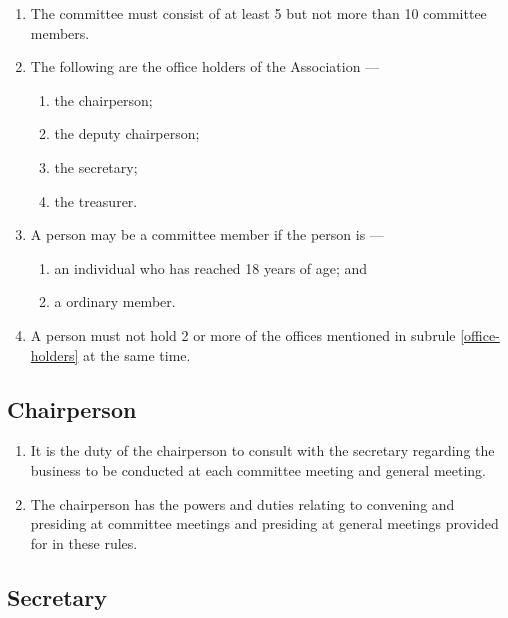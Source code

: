\documentclass[../constitution.tex]{subfiles}
\begin{document}
\begin{enumerate}

\item \label{number-of-committee-members} The committee must consist of at least 5 but not more than 10 committee members.
\item \label{office-holders} The following are the office holders of the Association --- 

  \begin{enumerate}
  
  \item the chairperson;
  \item the deputy chairperson;
  \item the secretary;
  \item the treasurer.
  \end{enumerate}
\item A person may be a committee member if the person is --- \label{committee-eligibility}

  \begin{enumerate}
  
  \item an individual who has reached 18 years of age; and
  \item a ordinary member.
  \end{enumerate}
\item A person must not hold 2 or more of the offices mentioned in subrule \ref{office-holders} at the same time.
\end{enumerate}

\hypertarget{chairperson}{%
\subsection{Chairperson}\label{chairperson}}

\begin{enumerate}

\item It is the duty of the chairperson to consult with the secretary regarding the business to be conducted at each committee meeting and general meeting.
\item The chairperson has the powers and duties relating to convening and presiding at committee meetings and presiding at general meetings provided for in these rules.
\end{enumerate}

\hypertarget{secretary}{%
\subsection{Secretary}\label{secretary}}
\end{document}
